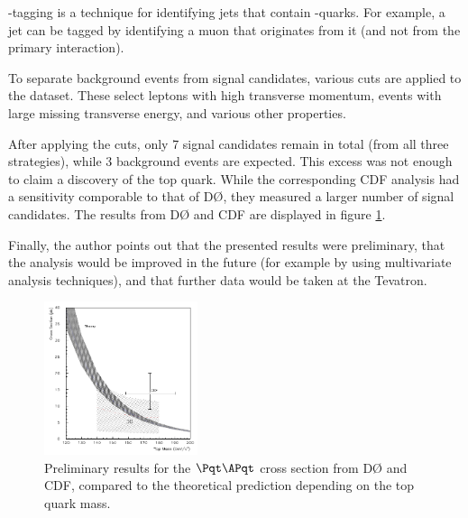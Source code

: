 \Pqb-tagging is a technique for identifying jets that contain \Pqb-quarks.
For example, a jet can be tagged by identifying a muon that originates from it (and not from the primary interaction).

To separate background events from signal candidates, various cuts are applied to the dataset.
These select leptons with high transverse momentum, events with large missing transverse energy, and various other properties.

After applying the cuts, only 7 signal candidates remain in total (from all three strategies), while 3 background events are expected.
This excess was not enough to claim a discovery of the top quark.
While the corresponding CDF analysis had a sensitivity comporable to that of DØ, they measured a larger number of signal candidates\cite{cdf}.
The results from DØ and CDF are displayed in figure \ref{results}.

Finally, the author points out that the presented results were preliminary, that the analysis would be improved in the future (for example by using multivariate analysis techniques), and that further data would be taken at the Tevatron.

\begin{figure}
  \centering
  \includegraphics[width=0.4\textwidth]{figures/result.pdf}
  \caption{
    Preliminary results for the $\Pqt\APqt$ cross section from DØ and CDF, compared to the theoretical prediction depending on the top quark mass.
  }
  \label{results}
\end{figure}

\nocite{*}
\printbibliography


